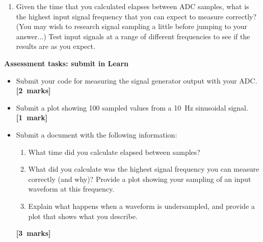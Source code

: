 \begin{enumerate}

\item [3.3.] Given the time that you calculated elapses between ADC samples, what is the highest input signal frequency that you can expect to measure correctly?
(You may wish to research signal sampling a little before jumping to your answer...)
Test input signals at a range of different frequencies to see if the results are as you expect.




 

\end{enumerate}

{\bf Assessment tasks: submit in Learn}

\begin{itemize}

\item Submit your code for measuring the signal generator output with your ADC.
\hfill {\bf[2~marks]}

\item Submit a plot showing 100 sampled values from a 10~Hz sinusoidal signal.
\hfill {\bf[1~mark]}

\item Submit a document with the following information:
\begin{enumerate}
\item What time did you calculate elapsed between samples?
\item What did you calculate was the highest signal frequency you can measure correctly (and why)? Provide a plot showing your sampling of an input waveform at this frequency.
\item Explain what happens when a waveform is undersampled, and provide a plot that shows what you describe.
\end{enumerate}
\hfill {\bf[3~marks]}

\end{itemize}

